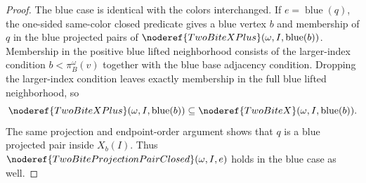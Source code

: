 \begin{proof}
The blue case is identical with the colors interchanged.  If
\(e=\operatorname{blue}(q)\), the one-sided same-color closed predicate gives
a blue vertex \(b\) and membership of \(q\) in the blue projected pairs of
\(\noderef{TwoBiteXPlus}(\omega,I,\operatorname{blue}(b))\).  Membership in
the positive blue lifted neighborhood consists of the larger-index condition
\(b<\pi_B^\omega(v)\) together with the blue base adjacency condition.  Dropping
the larger-index condition leaves exactly membership in the full blue lifted
neighborhood, so
\[
\noderef{TwoBiteXPlus}(\omega,I,\operatorname{blue}(b))
\subseteq
\noderef{TwoBiteX}(\omega,I,\operatorname{blue}(b)).
\]
The same projection and endpoint-order argument shows that \(q\) is a blue
projected pair inside \(X_b(I)\).  Thus
\(\noderef{TwoBiteProjectionPairClosed}(\omega,I,e)\) holds in the blue case
as well.
\end{proof}
